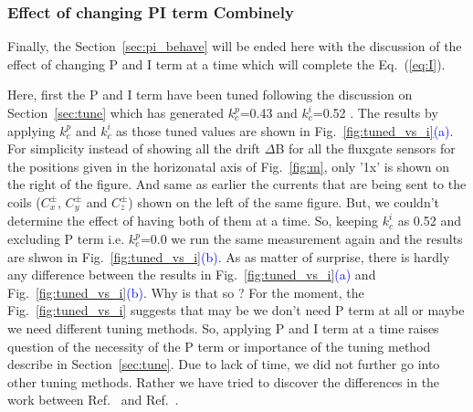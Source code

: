 \subsubsection{Effect of changing PI term Combinely}
Finally, the Section~\ref{sec:pi_behave} will be ended here with the discussion of the effect of changing P and I term at a time which will complete the Eq.~(\ref{eq:I}).

Here, first the P and I term have been tuned following the discussion on Section~\ref{sec:tune} which has generated $k_c^p$=0.43 and $k_c^i$=0.52 . The results by applying $k_c^p$ and $k_c^i$ as those tuned values are shown in Fig.~\ref{fig:tuned_vs_i}\textcolor{blue}{(a)}. For simplicity instead of showing all the drift $\Delta$B for all the fluxgate sensors for the positions given in the horizonatal axis of Fig.~\ref{fig:m}, only '1x' is shown on the right of the figure. And same as earlier the currents  that are being sent to the coils ($C_x^\pm$, $C_y^\pm$ and $C_z^\pm$) shown on the left of the same figure. But, we couldn't determine the effect of having both of them at a time. So, keeping $k_c^i$ as 0.52 and excluding P term i.e. $k_c^p$=0.0 we run the same measurement again and the results are shwon in Fig.~\ref{fig:tuned_vs_i}\textcolor{blue}{(b)}. As as matter of surprise, there is hardly any difference between the results in Fig.~\ref{fig:tuned_vs_i}\textcolor{blue}{(a)} and Fig.~\ref{fig:tuned_vs_i}\textcolor{blue}{(b)}. Why is that so ? For the moment, the Fig.~\ref{fig:tuned_vs_i} suggests that may be we don't need P term at all or maybe we need different tuning methods. So, applying P and I term at a time raises question of the necessity of the P term or importance of the tuning method describe in Section~\ref{sec:tune}. Due to lack of time, we did not further go into other tuning methods. Rather we have tried to discover the differences in the work between Ref.~\cite{bea} and Ref.~\cite{rawlik}.

